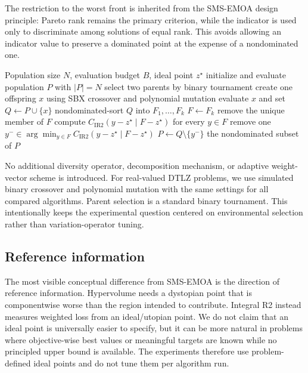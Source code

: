 \documentclass[runningheads]{llncs}
\newcommand{\IR}{\operatorname{IR2}}
\newcommand{\cIR}{C_{\IR}}
\begin{document}
The restriction to the worst front is inherited from the SMS-EMOA design principle: Pareto rank remains the primary criterion, while the indicator is used only to discriminate among solutions of equal rank. This avoids allowing an indicator value to preserve a dominated point at the expense of a nondominated one.

\begin{algorithm}[t]
\caption{Integral R2 EMOA (IR2-EMOA)}
\label{alg:ir2emoa}
\begin{algorithmic}[1]
\Require Population size $N$, evaluation budget $B$, ideal point $z^\star$
\State initialize and evaluate population $P$ with $|P|=N$
    \State select two parents by binary tournament
    \State create one offspring $x$ using SBX crossover and polynomial mutation
    \State evaluate $x$ and set $Q\gets P\cup\{x\}$
    \State nondominated-sort $Q$ into $F_1,\ldots,F_k$
    \State $F\gets F_k$ 
        \State remove the unique member of $F$
    \Else
        \State compute $\cIR(y-z^\star\mid F-z^\star)$ for every $y\in F$
        \State remove one $y^-\in\arg\min_{y\in F}\cIR(y-z^\star\mid F-z^\star)$
    \EndIf
    \State $P\gets Q\setminus\{y^-\}$
\EndWhile
\State \Return the nondominated subset of $P$
\end{algorithmic}
\end{algorithm}

No additional diversity operator, decomposition mechanism, or adaptive weight-vector scheme is introduced. For real-valued DTLZ problems, we use simulated binary crossover and polynomial mutation with the same settings for all compared algorithms. Parent selection is a standard binary tournament. This intentionally keeps the experimental question centered on environmental selection rather than variation-operator tuning.

\subsection{Reference information}

The most visible conceptual difference from SMS-EMOA is the direction of reference information. Hypervolume needs a dystopian point that is componentwise worse than the region intended to contribute. Integral R2 instead measures weighted loss from an ideal/utopian point. We do not claim that an ideal point is universally easier to specify, but it can be more natural in problems where objective-wise best values or meaningful targets are known while no principled upper bound is available. The experiments therefore use problem-defined ideal points and do not tune them per algorithm run.
\end{document}
